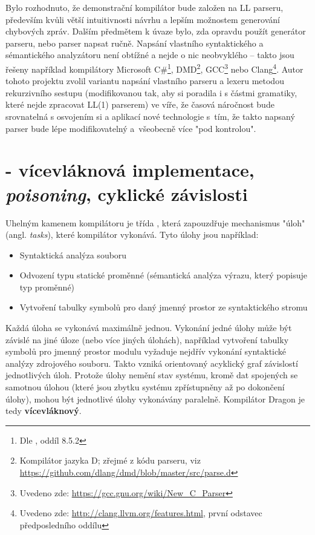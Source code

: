  Bylo rozhodnuto, že demonstrační kompilátor bude založen na LL parseru, především kvůli větší intuitivnosti návrhu a lepším možnostem generování chybových zpráv. Dalším předmětem k úvaze bylo, zda opravdu použít generátor parseru, nebo parser napsat ručně. Napsání vlastního syntaktického a sémantického analyzátoru není obtížné a nejde o nic neobvyklého -- takto jsou řešeny například kompilátory Microsoft C\#\footnote{Dle \cite{JavaCompilerConstructionCampbell}, oddíl 8.5.2}, DMD\footnote{Kompilátor jazyka D; zřejmé z kódu parseru, viz \url{https://github.com/dlang/dmd/blob/master/src/parse.d}}, GCC\footnote{Uvedeno zde: \url{https://gcc.gnu.org/wiki/New_C_Parser}} nebo Clang\footnote{Uvedeno zde: \url{http://clang.llvm.org/features.html}, první odstavec předposledního oddílu}. Autor tohoto projektu zvolil variantu napsání vlastního parseru a lexeru metodou rekurzivního sestupu (modifikovanou tak, aby si poradila i s částmi gramatiky, které nejde zpracovat LL(1) parserem) ve víře, že časová náročnost bude srovnatelná s osvojením si a aplikací nové technologie s~tím, že takto napsaný parser bude lépe modifikovatelný a~všeobecně více "pod kontrolou".
 
\section{ - vícevláknová implementace, \textit{poisoning}, cyklické závislosti}
Uhelným kamenem kompilátoru je třída , která zapouzdřuje mechanismus "úloh" (angl. \textit{tasks}), které kompilátor vykonává. Tyto úlohy jsou například:
\begin{itemize}
	\item Syntaktická analýza souboru
	\item Odvození typu statické proměnné (sémantická analýza výrazu, který popisuje typ proměnné)
	\item Vytvoření tabulky symbolů pro daný jmenný prostor ze syntaktického stromu
\end{itemize}

Každá úloha se vykonává maximálně jednou. Vykonání jedné úlohy může být závislé na jiné úloze (nebo více jiných úlohách), například vytvoření tabulky symbolů pro jmenný prostor modulu vyžaduje nejdřív vykonání syntaktické analýzy zdrojového souboru. Takto vzniká orientovaný acyklický graf závislostí jednotlivých úloh. Protože úlohy nemění stav systému, kromě dat spojených se samotnou úlohou (které jsou zbytku systému zpřístupněny až po dokončení úlohy), mohou být jednotlivé úlohy vykonávány paralelně. Kompilátor Dragon je tedy \textbf{vícevláknový}.

